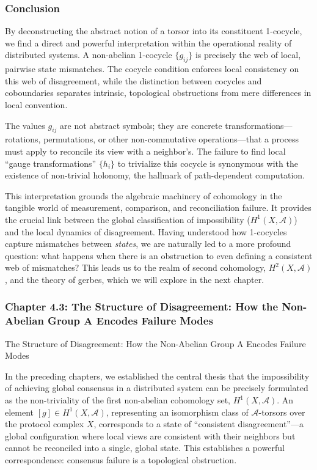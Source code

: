 \documentclass[
]{article}
\begin{document}
\subsubsection{Conclusion}\label{conclusion}

By deconstructing the abstract notion of a torsor into its constituent
1-cocycle, we find a direct and powerful interpretation within the
operational reality of distributed systems. A non-abelian 1-cocycle
\(\{g_{ij}\}\) is precisely the web of local, pairwise state mismatches.
The cocycle condition enforces local consistency on this web of
disagreement, while the distinction between cocycles and coboundaries
separates intrinsic, topological obstructions from mere differences in
local convention.

The values \(g_{ij}\) are not abstract symbols; they are concrete
transformations---rotations, permutations, or other non-commutative
operations---that a process must apply to reconcile its view with a
neighbor's. The failure to find local ``gauge transformations''
\(\{h_i\}\) to trivialize this cocycle is synonymous with the existence
of non-trivial holonomy, the hallmark of path-dependent computation.

This interpretation grounds the algebraic machinery of cohomology in the
tangible world of measurement, comparison, and reconciliation failure.
It provides the crucial link between the global classification of
impossibility (\(H^1(X, \mathcal{A})\)) and the local dynamics of
disagreement. Having understood how 1-cocycles capture mismatches
between \emph{states}, we are naturally led to a more profound question:
what happens when there is an obstruction to even defining a consistent
web of mismatches? This leads us to the realm of second cohomology,
\(H^2(X, \mathcal{A})\), and the theory of gerbes, which we will explore
in the next chapter.

\subsubsection{Chapter 4.3: The Structure of Disagreement: How the
Non-Abelian Group A Encodes Failure
Modes}\label{chapter-4.3-the-structure-of-disagreement-how-the-non-abelian-group-a-encodes-failure-modes}

\protect{}\label{chapter-4-3-The_Structure_of_Disagreement__How_the_N}{}

The Structure of Disagreement: How the Non-Abelian Group A Encodes
Failure Modes

In the preceding chapters, we established the central thesis that the
impossibility of achieving global consensus in a distributed system can
be precisely formulated as the non-triviality of the first non-abelian
cohomology set, \(H^1(X, \mathcal{A})\). An element
\([g] \in H^1(X, \mathcal{A})\), representing an isomorphism class of
\(\mathcal{A}\)-torsors over the protocol complex \(X\), corresponds to
a state of ``consistent disagreement''---a global configuration where
local views are consistent with their neighbors but cannot be reconciled
into a single, global state. This establishes a powerful correspondence:
consensus failure is a topological obstruction.
\end{document}
